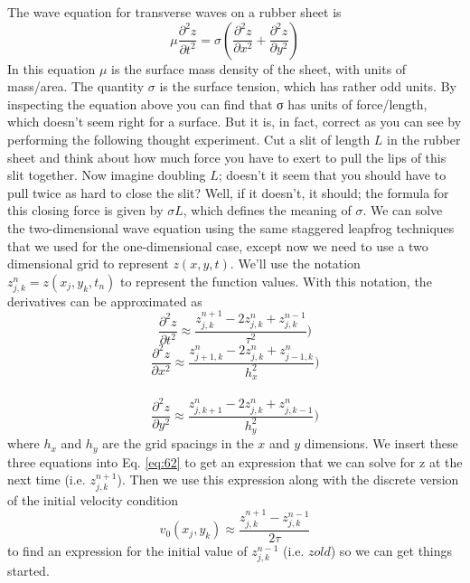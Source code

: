 The wave equation for transverse waves on a rubber sheet is
\begin{equation}\label{eq:62}
\mu \frac{\partial^2 z}{\partial t^2} = \sigma (\frac{\partial^2 z}{\partial x^2} + \frac{\partial^2 z}{\partial y^2} )
\end{equation}
In this equation $\mu$ is the surface mass density of the sheet, with units of mass/area.
The quantity $\sigma$ is the surface tension, which has rather odd units. By inspecting
the equation above you can find that σ has units of force/length, which doesn\rq t
seem right for a surface. But it is, in fact, correct as you can see by performing the
following thought experiment. Cut a slit of length $L$ in the rubber sheet and think
about how much force you have to exert to pull the lips of this slit together. Now
imagine doubling $L$; doesn\rq t it seem that you should have to pull twice as hard to close the slit? Well, if it doesn\rq t, it should; the formula for this closing force is
given by $\sigma L$, which defines the meaning of $\sigma$.
We can solve the two-dimensional wave equation using the same staggered
leapfrog techniques that we used for the one-dimensional case, except now we
need to use a two dimensional grid to represent $z(x, y,t)$. We\rq ll use the notation $ z^n_{j,k} = z(x_j,y_k,t_n) $ to represent the function values. With this notation, the
derivatives can be approximated as
\begin{equation}\label{eq:63}
\frac{\partial^2 z}{\partial t^2} \approx \frac{z^{n+1}_{j,k}-2z^n_{j,k}+z^{n-1}_{j,k}}{\tau^2} )
\end{equation}
\begin{equation}\label{eq:64}
\frac{\partial^2 z}{\partial x^2} \approx \frac{z^{n}_{j+1,k}-2z^n_{j,k}+z^{n}_{j-1,k}}{h^2_x} )
\end{equation}\\
\begin{equation}\label{eq:65}
\frac{\partial^2 z}{\partial y^2} \approx \frac{z^{n}_{j,k+1}-2z^n_{j,k}+z^{n}_{j,k-1}}{h^2_y} )
\end{equation}
where $h_x$ and $h_y$ are the grid spacings in the $x$ and $y$ dimensions. We insert these
three equations into Eq. \eqref{eq:62} to get an expression that we can solve for z at the
next time (i.e. $z^{n+1}_{j,k} $). Then we use this expression along with the discrete version
of the initial velocity condition
\begin{equation}\label{eq:66}
v_0(x_j,y_k)\approx \frac{z^{n+1}_{j,k}-z^{n-1}_{j,k}}{2\tau}
\end{equation}
to find an expression for the initial value of $z^{n-1}_{j,k}$ (i.e. $zold$) so we can get things
started.
